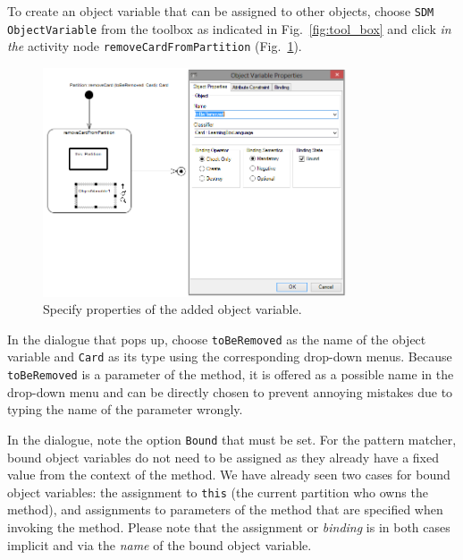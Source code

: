 To create an object variable that can be assigned to other objects, choose \texttt{SDM ObjectVariable} from the toolbox as indicated in
Fig.~\ref{fig:tool_box} and click \emph{in the} activity node \texttt{removeCardFromPartition} (Fig.~\ref{fig:object_variable_properties}). 


\begin{figure}[htp]
\begin{center}
  \includegraphics[width=0.8\textwidth]{pics/sdmBilder/removeCard/sdm10RAW}
  \caption{Specify properties of the added object variable.}  
  \label{fig:object_variable_properties}
\end{center}
\end{figure}

In the dialogue that pops up, choose \texttt{toBeRemoved} as the name of the object variable and \texttt{Card} as its type using the corresponding drop-down menus. 
Because \texttt{toBeRemoved} is a parameter of the method, it is offered as a possible name in the drop-down menu and can be directly chosen to prevent annoying mistakes due to typing the name of the parameter wrongly.

In the dialogue, note the option \texttt{Bound} that must be set.
For the pattern matcher, bound object variables do not need to be assigned as they already have a fixed value from the context of the method.  
We have already seen two cases  for bound object variables: the assignment to \texttt{this} (the current  partition who owns the method), and assignments to parameters of the 
method that  are specified when invoking the method.  
Please note that the assignment or \emph{binding} is in both cases implicit and via the \emph{name} of the bound object variable. 

